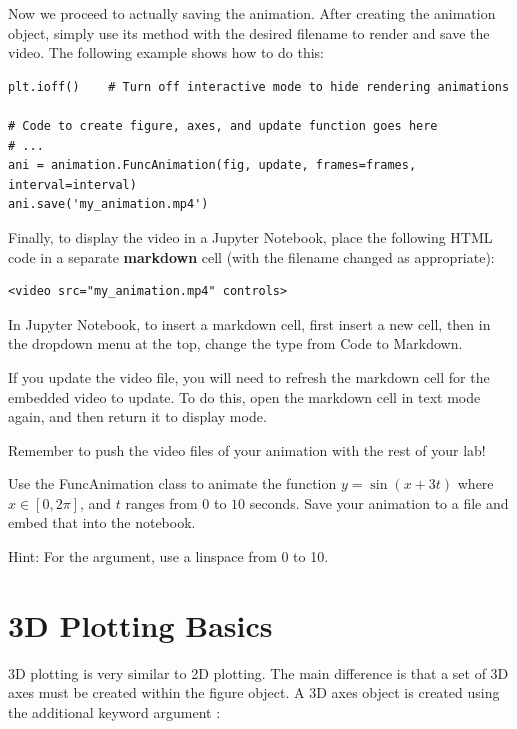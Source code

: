 Now we proceed to actually saving the animation.
After creating the animation object, simply use its  method with the desired filename to render and save the video. 
The following example shows how to do this:
\begin{lstlisting}
plt.ioff()    # Turn off interactive mode to hide rendering animations

# Code to create figure, axes, and update function goes here
# ...
ani = animation.FuncAnimation(fig, update, frames=frames, interval=interval)
ani.save('my_animation.mp4')
\end{lstlisting}
Finally, to display the  video in a Jupyter Notebook, place the following HTML code in a separate \textbf{markdown} cell (with the filename changed as appropriate):
\begin{lstlisting}
<video src="my_animation.mp4" controls>
\end{lstlisting}

\begin{info}
In Jupyter Notebook, to insert a markdown cell, first insert a new cell, then in the dropdown menu at the top, change the type from Code to Markdown.

If you update the video file, you will need to refresh the markdown cell for the embedded video to update.
To do this, open the markdown cell in text mode again, and then return it to display mode.

Remember to push the video files of your animation with the rest of your lab!
\end{info}

\begin{problem}
Use the FuncAnimation class to animate the function $y=\sin(x+3t)$ where $x \in [0,2\pi]$, and $t$ ranges from $0$ to $10$ seconds. 
Save your animation to a file and embed that into the notebook.

Hint: For the  argument, use a linspace from 0 to 10.
\end{problem}


\section*{3D Plotting Basics}
3D plotting is very similar to 2D plotting.
The main difference is that a set of 3D axes must be created within the figure object.
A 3D axes object is created using the additional keyword argument :

